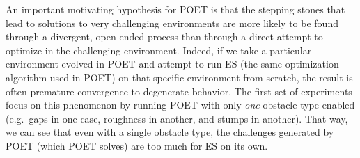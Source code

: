 \documentclass{article}
\newcommand{\jc}[1]{\comments{\textcolor{deepForestGreen}{[JC: #1]}}}
\newcommand{\ks}[1]{\comments{\textcolor{purple}{[Ken: #1]}}}
\newcommand{\rw}[1]{\comments{\textcolor{blue}{[Rui: #1]}}}
\newcommand{\comments}[1]{#1}
\begin{document}

An important motivating hypothesis for POET is that the stepping stones that lead to solutions to very challenging environments are more likely to be found through a divergent, open-ended process than through a direct attempt to
optimize in the challenging environment.  
Indeed, if we take a particular environment evolved in POET and attempt to run ES (the same optimization algorithm used in POET) on that specific environment from scratch, the result is often premature convergence to degenerate behavior.
The first set of experiments focus on this phenomenon by running POET with only \emph{one} obstacle type enabled (e.g.\ gaps in one case, roughness in another, and stumps in another). %
That way, we can see that even with a single obstacle type, the challenges generated by POET (which POET solves) are too much for ES on its own. 
\end{document}
